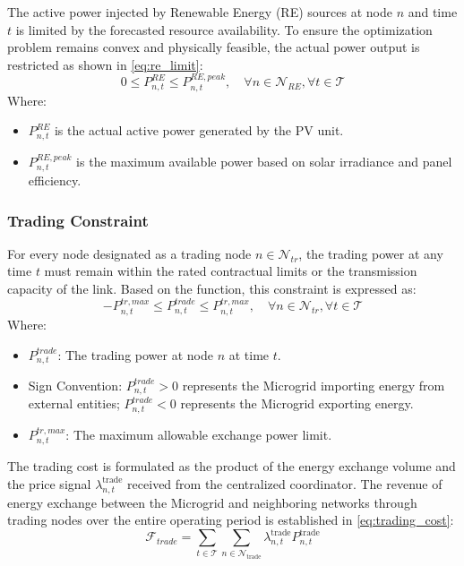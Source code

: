 \documentclass[preprint,12pt]{elsarticle}
\begin{document}
The active power injected by Renewable Energy (RE) sources at node $n$ and time $t$ is limited by the forecasted resource availability. To ensure the optimization problem remains convex and physically feasible, the actual power output is restricted as shown in \eqref{eq:re_limit}:
\begin{equation}
0 \le P_{n,t}^{RE} \le P_{n,t}^{RE,peak}, \quad \forall n \in \mathcal{N}_{RE}, \forall t \in \mathcal{T}
\label{eq:re_limit}
\end{equation}
Where:
\begin{itemize}
    \item $P_{n,t}^{RE}$ is the actual active power generated by the PV unit.
    \item $P_{n,t}^{RE,peak}$ is the maximum available power based on solar irradiance and panel efficiency.
\end{itemize}

\subsubsection{Trading Constraint}
For every node designated as a trading node $n \in \mathcal{N}_{tr}$, the trading power at any time $t$ must remain within the rated contractual limits or the transmission capacity of the link. Based on the function, this constraint is expressed as:
\begin{equation}
    -P_{n,t}^{tr, max} \le P_{n,t}^{trade} \le P_{n,t}^{tr, max}, \quad \forall n \in \mathcal{N}_{tr}, \forall t \in \mathcal{T}
    \label{eq:trading_limit}
\end{equation}
Where:
\begin{itemize}
    \item $P_{n,t}^{trade}$: The trading power at node $n$ at time $t$.
    \item Sign Convention: $P_{n,t}^{trade} > 0$ represents the Microgrid importing energy from external entities; 
    $P_{n,t}^{trade} < 0$ represents the Microgrid exporting energy.
    \item $P_{n,t}^{tr, max}$: The maximum allowable exchange power limit.
\end{itemize}


The trading cost is formulated as the product of the energy exchange volume and the price signal $\lambda_{n,t}^{\text{trade}}$ received from the centralized coordinator. The revenue of energy exchange between the Microgrid and neighboring networks through trading nodes over the entire operating period is established in \eqref{eq:trading_cost}:
    \begin{equation}
        \mathcal{F}_{trade} =\sum_{t \in \mathcal{T}} \sum_{n \in \mathcal{N}_{\text{trade}}} \lambda_{n,t}^{\text{trade}} P_{n,t}^{\text{trade}}
        \label{eq:trading_cost}
    \end{equation} 
\end{document}

